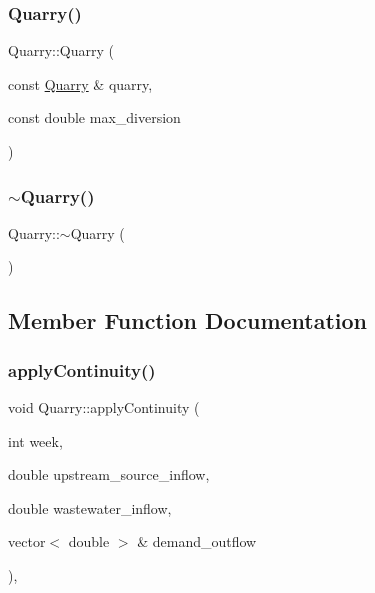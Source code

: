 \mbox{\label{classQuarry_a5a43f5a3f1cb837bc313046cf82b49e3}} 
\subsubsection{\texorpdfstring{Quarry()}{Quarry()}\hspace{0.1cm}{\footnotesize\ttfamily [5/5]}}
{\footnotesize\ttfamily Quarry\+::\+Quarry (\begin{DoxyParamCaption}\item[{const \mbox{\hyperlink{classQuarry}{Quarry}} \&}]{quarry,  }\item[{const double}]{max\+\_\+diversion }\end{DoxyParamCaption})}

\mbox{\label{classQuarry_a6c528c6222e8e5adc134db5cafbe62e3}} 
\subsubsection{\texorpdfstring{$\sim$\+Quarry()}{~Quarry()}}
{\footnotesize\ttfamily Quarry\+::$\sim$\+Quarry (\begin{DoxyParamCaption}{ }\end{DoxyParamCaption})}



\subsection{Member Function Documentation}
\mbox{\label{classQuarry_a6999b854a740ce92baaa610cf5b08bd9}} 
\subsubsection{\texorpdfstring{apply\+Continuity()}{applyContinuity()}}
{\footnotesize\ttfamily void Quarry\+::apply\+Continuity (\begin{DoxyParamCaption}\item[{int}]{week,  }\item[{double}]{upstream\+\_\+source\+\_\+inflow,  }\item[{double}]{wastewater\+\_\+inflow,  }\item[{vector$<$ double $>$ \&}]{demand\+\_\+outflow }\end{DoxyParamCaption})\hspace{0.3cm}{\ttfamily [override]}, {\ttfamily [virtual]}}

